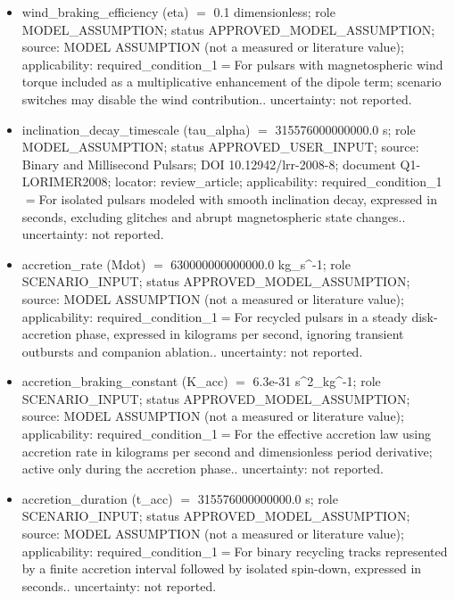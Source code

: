 \documentclass[11pt]{article}
\begin{document}
\begin{itemize}
\item wind\_\allowbreak{}braking\_\allowbreak{}efficiency (eta) \ensuremath{=} 0.1 dimensionless; role MODEL\_\allowbreak{}ASSUMPTION; status APPROVED\_\allowbreak{}MODEL\_\allowbreak{}ASSUMPTION; source: MODEL ASSUMPTION (not a measured or literature value); applicability: required\_\allowbreak{}condition\_\allowbreak{}1\ensuremath{=}For pulsars with magnetospheric wind torque included as a multiplicative enhancement of the dipole term; scenario switches may disable the wind contribution.. uncertainty: not reported.
\item inclination\_\allowbreak{}decay\_\allowbreak{}timescale (tau\_\allowbreak{}alpha) \ensuremath{=} 315576000000000.0 s; role MODEL\_\allowbreak{}ASSUMPTION; status APPROVED\_\allowbreak{}USER\_\allowbreak{}INPUT; source: Binary and Millisecond Pulsars; DOI 10.12942/\allowbreak{}lrr-2008-8; document Q1-LORIMER2008; locator: review\_\allowbreak{}article; applicability: required\_\allowbreak{}condition\_\allowbreak{}1\ensuremath{=}For isolated pulsars modeled with smooth inclination decay, expressed in seconds, excluding glitches and abrupt magnetospheric state changes.. uncertainty: not reported.
\item accretion\_\allowbreak{}rate (Mdot) \ensuremath{=} 630000000000000.0 kg\_\allowbreak{}s\textasciicircum{}-1; role SCENARIO\_\allowbreak{}INPUT; status APPROVED\_\allowbreak{}MODEL\_\allowbreak{}ASSUMPTION; source: MODEL ASSUMPTION (not a measured or literature value); applicability: required\_\allowbreak{}condition\_\allowbreak{}1\ensuremath{=}For recycled pulsars in a steady disk-accretion phase, expressed in kilograms per second, ignoring transient outbursts and companion ablation.. uncertainty: not reported.
\item accretion\_\allowbreak{}braking\_\allowbreak{}constant (K\_\allowbreak{}acc) \ensuremath{=} 6.3e-31 s\textasciicircum{}2\_\allowbreak{}kg\textasciicircum{}-1; role SCENARIO\_\allowbreak{}INPUT; status APPROVED\_\allowbreak{}MODEL\_\allowbreak{}ASSUMPTION; source: MODEL ASSUMPTION (not a measured or literature value); applicability: required\_\allowbreak{}condition\_\allowbreak{}1\ensuremath{=}For the effective accretion law using accretion rate in kilograms per second and dimensionless period derivative; active only during the accretion phase.. uncertainty: not reported.
\item accretion\_\allowbreak{}duration (t\_\allowbreak{}acc) \ensuremath{=} 315576000000000.0 s; role SCENARIO\_\allowbreak{}INPUT; status APPROVED\_\allowbreak{}MODEL\_\allowbreak{}ASSUMPTION; source: MODEL ASSUMPTION (not a measured or literature value); applicability: required\_\allowbreak{}condition\_\allowbreak{}1\ensuremath{=}For binary recycling tracks represented by a finite accretion interval followed by isolated spin-down, expressed in seconds.. uncertainty: not reported.

\end{itemize}
\end{document}
